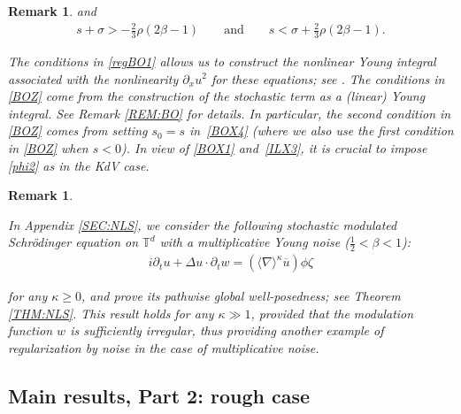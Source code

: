\documentclass[letterpaper, 11pt,  reqno]{amsart}
\newtheorem{remark}[theorem]{Remark}
\newcommand{\1}{\hspace{0.5mm}\textup{I}\hspace{0.5mm}}
\newcommand{\noi}{\noindent}
\newcommand{\T}{\mathbb{T}}
\newcommand{\be}{\beta}
\newcommand{\nb}{\nabla}
\newcommand{\Dl}{\Delta}
\newcommand{\kk}{\kappa}
\newcommand{\s}{\sigma}
\newcommand{\cj}{\overline}
\newcommand{\dx}{\partial_x}
\newcommand{\dt}{\partial_t}
\newcommand{\jb}[1]
{\langle #1 \rangle}
\numberwithin{equation}{section}
\numberwithin{theorem}{section}
\begin{document}
\begin{remark}
\noi
and 
\begin{align}
s + \s > -  \frac 23 \rho (2\be -1 )
\qquad \text{and}
\qquad 
s <  \s +   \frac 23 \rho (2\be -1 ).
\label{BOZ}
\end{align}


The conditions in \eqref{regBO1}
allows us to construct the nonlinear Young integral
associated with the nonlinearity $\dx u^2$
for these equations; see
\cite[Propositions 5.1 and 5.2]{CGLLO1}.
The conditions in \eqref{BOZ} come
from the construction of the stochastic term
as a (linear) Young integral.
See
Remark \ref{REM:BO} for details.
In particular, 
the second condition
in \eqref{BOZ}
comes from setting 
 $s_0 = s$ in~\eqref{BOX4}
 (where we also use the first condition in \eqref{BOZ} when $s < 0$).
In view of \eqref{BOX1} and~\eqref{ILX3}, 
it is crucial to impose \eqref{phi2}
as in the KdV case.





\end{remark}



\begin{remark}\label{REM:NLS1}\rm 

In Appendix \ref{SEC:NLS}, 
we consider the following stochastic modulated 
Schr\"odinger equation
on $\T^d$
with a multiplicative Young noise ($\frac 12 < \be < 1$):
\begin{align}
i \dt u+  \Dl  u \cdot \dt w =  (\jb{\nb}^\kk \cj u) \phi \zeta
\label{NLS2}
\end{align}

\noi
for any $\kk \ge 0$, 
and 
prove its pathwise global well-posedness;
see Theorem \ref{THM:NLS}.
This result
holds for any $\kk \gg 1$, 
provided that the modulation function $w$
is sufficiently irregular, 
thus providing another example
of regularization by noise in the case of multiplicative noise.




\end{remark}





\subsection{Main results, Part 2: rough case}
\label{SUBSEC:main2}
\end{document}
